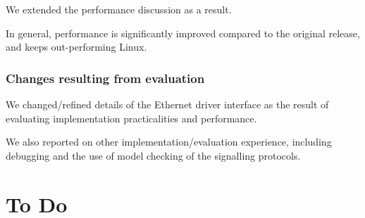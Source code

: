 \documentclass[a4paper,12pt]{report}
\begin{document}
We extended the performance discussion as a result.

In general, performance is significantly improved compared to the
original release, and keeps out-performing Linux.

\subsection{Changes resulting from evaluation}

We changed/refined details of the Ethernet driver interface as the
result of evaluating implementation practicalities and performance.

We also reported on other implementation/evaluation experience,
including debugging and the use of model checking of the signalling protocols.

\ifDraft

\chapter{To Do}\label{s:to-do}
\end{document}
